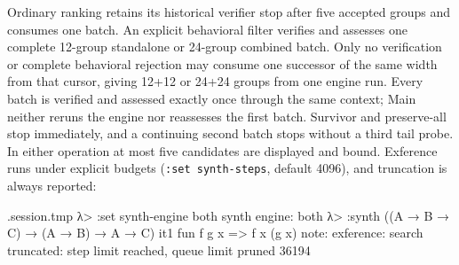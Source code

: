 \documentclass[11pt,oneside]{article}
\newcommand{\code}[1]{\texttt{#1}}
\newenvironment{session}
 {\VerbatimEnvironment\begin{VerbatimOut}{\jobname.session.tmp}}
 {\end{VerbatimOut}%
  \begin{sessionouter}%
  \VerbatimInput[fontsize=\footnotesize, breaklines=true,
    breaksymbolleft={\textcolor{stone}{\footnotesize$\hookrightarrow$}},
    formatcom=\color{ink}, tabsize=4]{\jobname.session.tmp}%
  \end{sessionouter}}
\begin{document}
Ordinary ranking retains its historical verifier stop after five accepted
groups and consumes one batch. An explicit behavioral filter verifies and
assesses one complete 12-group standalone or 24-group combined batch. Only no
verification or complete behavioral rejection may consume one successor of the
same width from that cursor, giving 12+12 or 24+24 groups from one engine run.
Every batch is verified and assessed exactly once through the same context;
Main neither reruns the engine nor reassesses the first batch. Survivor and
preserve-all stop immediately, and a continuing second batch stops without a
third tail probe. In either operation at most five candidates are displayed and
bound. Exference runs under
explicit budgets
(\code{:set synth-steps}, default 4096), and truncation is always
reported:

\begin{session}
λ> :set synth-engine both
synth engine: both
λ> :synth ((A → B → C) → (A → B) → A → C)
  it1  fun f g x => f x (g x)
note: exference: search truncated: step limit reached, queue limit pruned 36194
\end{session}
\end{document}
